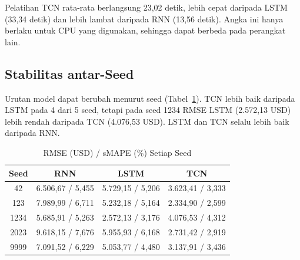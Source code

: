 \documentclass[conference,a4paper]{IEEEtran}
\begin{document}
\begin{table}[!t]
\centering
\caption{Kinerja pada Data Test (Rata-rata $\pm$ Simpangan Baku dari Lima Seed)}
\label{tab:kinerja}
\footnotesize
{}
\end{table}

Pelatihan TCN rata-rata berlangsung 23,02 detik, lebih cepat daripada LSTM (33,34 detik) dan lebih lambat daripada RNN (13,56 detik). Angka ini hanya berlaku untuk CPU yang digunakan, sehingga dapat berbeda pada perangkat lain.

\subsection{Stabilitas antar-Seed}
Urutan model dapat berubah menurut seed (Tabel~\ref{tab:seed}). TCN lebih baik daripada LSTM pada 4 dari 5 seed, tetapi pada seed 1234 RMSE LSTM (2.572,13 USD) lebih rendah daripada TCN (4.076,53 USD). LSTM dan TCN selalu lebih baik daripada RNN.

\begin{table}[!t]
\centering
\caption{RMSE (USD) / sMAPE (\%) Setiap Seed}
\label{tab:seed}
\footnotesize
\begin{tabular}{@{}cccc@{}}
\toprule
\textbf{Seed} & \textbf{RNN} & \textbf{LSTM} & \textbf{TCN} \\
\midrule
42 & 6.506,67 / 5,455 & 5.729,15 / 5,206 & 3.623,41 / 3,333 \\
123 & 7.989,99 / 6,711 & 5.232,18 / 5,164 & 2.334,90 / 2,599 \\
1234 & 5.685,91 / 5,263 & 2.572,13 / 3,176 & 4.076,53 / 4,312 \\
2023 & 9.618,15 / 7,676 & 5.955,93 / 6,168 & 2.731,42 / 2,919 \\
9999 & 7.091,52 / 6,229 & 5.053,77 / 4,480 & 3.137,91 / 3,436 \\
\bottomrule
\end{tabular}
\end{table}
\end{document}
